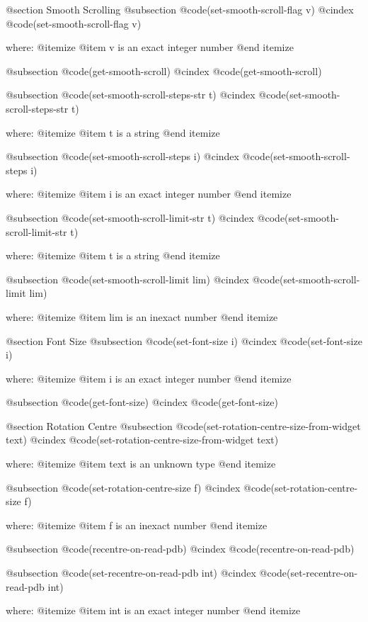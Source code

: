 @section Smooth Scrolling 
@subsection @code{(set-smooth-scroll-flag v)}
@cindex @code{(set-smooth-scroll-flag v)}
 
where: 
 @itemize 
     @item v is an exact integer number
 @end itemize


@subsection @code{(get-smooth-scroll)}
@cindex @code{(get-smooth-scroll)}
 
@subsection @code{(set-smooth-scroll-steps-str t)}
@cindex @code{(set-smooth-scroll-steps-str t)}
 
where: 
 @itemize 
     @item t is a string
 @end itemize


@subsection @code{(set-smooth-scroll-steps i)}
@cindex @code{(set-smooth-scroll-steps i)}
 
where: 
 @itemize 
     @item i is an exact integer number
 @end itemize


@subsection @code{(set-smooth-scroll-limit-str t)}
@cindex @code{(set-smooth-scroll-limit-str t)}
 
where: 
 @itemize 
     @item t is a string
 @end itemize


@subsection @code{(set-smooth-scroll-limit lim)}
@cindex @code{(set-smooth-scroll-limit lim)}
 
where: 
 @itemize 
     @item lim is an inexact number
 @end itemize



@section Font Size 
@subsection @code{(set-font-size i)}
@cindex @code{(set-font-size i)}
 
where: 
 @itemize 
     @item i is an exact integer number
 @end itemize


@subsection @code{(get-font-size)}
@cindex @code{(get-font-size)}
 

@section Rotation Centre 
@subsection @code{(set-rotation-centre-size-from-widget text)}
@cindex @code{(set-rotation-centre-size-from-widget text)}
 
where: 
 @itemize 
     @item text is an unknown type
 @end itemize


@subsection @code{(set-rotation-centre-size f)}
@cindex @code{(set-rotation-centre-size f)}
 
where: 
 @itemize 
     @item f is an inexact number
 @end itemize


@subsection @code{(recentre-on-read-pdb)}
@cindex @code{(recentre-on-read-pdb)}
 
@subsection @code{(set-recentre-on-read-pdb int)}
@cindex @code{(set-recentre-on-read-pdb int)}
 
where: 
 @itemize 
     @item int is an exact integer number
 @end itemize


